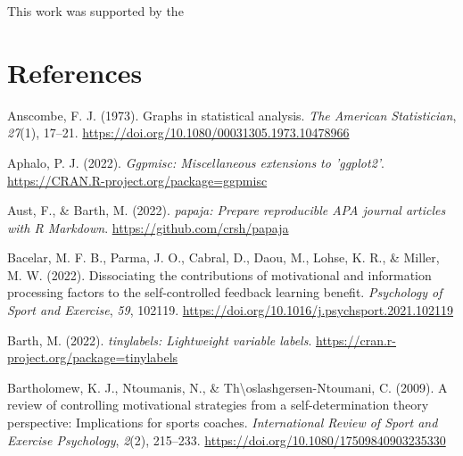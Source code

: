 \documentclass[
  man, donotrepeattitle,mask,floatsintext]{apa7}
\newlength{\cslhangindent}
\newlength{\cslentryspacingunit} %
\newenvironment{CSLReferences}[2] %
 {%
  \setlength{\parindent}{0pt}
  \ifodd #1
  \let\oldpar\par
  \def\par{\hangindent=\cslhangindent\oldpar}
  \fi
  \setlength{\parskip}{#2\cslentryspacingunit}
 }%
 {}
\begin{document}
\noindent This work was supported by the 

\newpage

\hypertarget{references}{%
\section{References}\label{references}}

\vspace{2ex}

\hypertarget{refs}{}
\begin{CSLReferences}{1}{0}
\leavevmode{}%
Anscombe, F. J. (1973). Graphs in statistical analysis. \emph{The American Statistician}, \emph{27}(1), 17--21. \url{https://doi.org/10.1080/00031305.1973.10478966}

\leavevmode{}%
Aphalo, P. J. (2022). \emph{Ggpmisc: Miscellaneous extensions to 'ggplot2'}. \url{https://CRAN.R-project.org/package=ggpmisc}

\leavevmode{}%
Aust, F., \& Barth, M. (2022). \emph{{papaja}: {Prepare} reproducible {APA} journal articles with {R Markdown}}. \url{https://github.com/crsh/papaja}

\leavevmode{}%
Bacelar, M. F. B., Parma, J. O., Cabral, D., Daou, M., Lohse, K. R., \& Miller, M. W. (2022). Dissociating the contributions of motivational and information processing factors to the self-controlled feedback learning benefit. \emph{Psychology of Sport and Exercise}, \emph{59}, 102119. \url{https://doi.org/10.1016/j.psychsport.2021.102119}

\leavevmode{}%
Barth, M. (2022). \emph{{tinylabels}: Lightweight variable labels}. \url{https://cran.r-project.org/package=tinylabels}

\leavevmode{}%
Bartholomew, K. J., Ntoumanis, N., \& Th\textbackslash oslashgersen-Ntoumani, C. (2009). A review of controlling motivational strategies from a self-determination theory perspective: Implications for sports coaches. \emph{International Review of Sport and Exercise Psychology}, \emph{2}(2), 215--233. \url{https://doi.org/10.1080/17509840903235330}


\end{CSLReferences}
\end{document}
